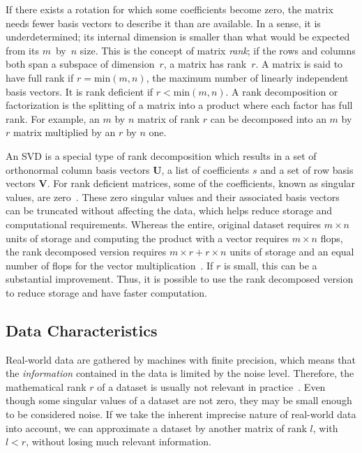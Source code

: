 \documentclass[ijgi,article,submit,moreauthors,pdftex,10pt,a4paper]{Definitions/mdpi}
\begin{document}
If there exists a rotation for which some coefficients become zero, the matrix needs fewer basis vectors to describe it than are available. In a sense, it is underdetermined; its internal dimension is smaller than what would be expected from its $m$~by~$n$ size. This is the concept of matrix \textit{rank}; if the rows and columns both span a subspace of dimension~$r$, a matrix has rank~$r$. A matrix is said to have full rank if $r = \text{min}(m, n)$, the maximum number of linearly independent basis vectors. It is rank deficient if $r < \text{min}(m, n)$. A rank decomposition or factorization is the splitting of a matrix into a product where each factor has full rank. For example, an $m$ by $n$ matrix of rank $r$ can be decomposed into an $m$ by $r$ matrix multiplied by an $r$ by $n$ one. %

An SVD is a special type of rank decomposition which results in a set of orthonormal column basis vectors $\mathbf{U}$, a list of coefficients $s$ and a set of row basis vectors $\mathbf{V}$. For rank deficient matrices, some of the coefficients, known as singular values, are zero~\cite{Golub1970}. These zero singular values and their associated basis vectors can be truncated without affecting the data, which helps reduce storage and computational requirements. Whereas the entire, original dataset requires $m \times n$ units of storage and computing the product with a vector requires $m \times n$ flops, the rank decomposed version requires $m \times r + r \times n$ units of storage and an equal number of flops for the vector multiplication~\cite{Martinsson2016}. If $r$ is small, this can be a substantial improvement. Thus, it is possible to use the rank decomposed version to reduce storage and have faster computation.

\subsection{Data Characteristics}
\label{sec:Introduction/Data Characteristics}

Real-world data are gathered by machines with finite precision, which means that the \textit{information} contained in the data is limited by the noise level. Therefore, the mathematical rank $r$ of a dataset is usually not relevant in practice~\cite{Martinsson2016}. Even though some singular values of a dataset are not zero, they may be small enough to be considered noise. If we take the inherent imprecise nature of real-world data into account, we can approximate a dataset by another matrix of rank $l$, with $l < r$, without losing much relevant information.
\end{document}
